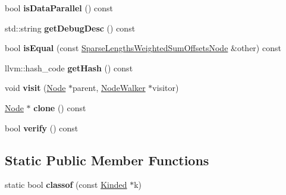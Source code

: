 \begin{DoxyCompactItemize}
\item 
\mbox{\label{classglow_1_1_sparse_lengths_weighted_sum_offsets_node_ac48c77093e3fdeac98dd497085a49a45}} 
bool {\bfseries is\+Data\+Parallel} () const
\item 
\mbox{\label{classglow_1_1_sparse_lengths_weighted_sum_offsets_node_ac361f39a370e15993a1435ebfd813213}} 
std\+::string {\bfseries get\+Debug\+Desc} () const
\item 
\mbox{\label{classglow_1_1_sparse_lengths_weighted_sum_offsets_node_afb66db9efd90742e459191e574ea4b37}} 
bool {\bfseries is\+Equal} (const \hyperlink{classglow_1_1_sparse_lengths_weighted_sum_offsets_node}{Sparse\+Lengths\+Weighted\+Sum\+Offsets\+Node} \&other) const
\item 
\mbox{\label{classglow_1_1_sparse_lengths_weighted_sum_offsets_node_accccfc5ce1c37bc92030a566503bfc4d}} 
llvm\+::hash\+\_\+code {\bfseries get\+Hash} () const
\item 
\mbox{\label{classglow_1_1_sparse_lengths_weighted_sum_offsets_node_ae7231c32c2aac37eef54eb6cc139e915}} 
void {\bfseries visit} (\hyperlink{classglow_1_1_node}{Node} $\ast$parent, \hyperlink{classglow_1_1_node_walker}{Node\+Walker} $\ast$visitor)
\item 
\mbox{\label{classglow_1_1_sparse_lengths_weighted_sum_offsets_node_aa5326a5ae70afdf02e55c235672e9d03}} 
\hyperlink{classglow_1_1_node}{Node} $\ast$ {\bfseries clone} () const
\item 
\mbox{\label{classglow_1_1_sparse_lengths_weighted_sum_offsets_node_aad9675ea9f0ed5c306d6a6c64f8b586f}} 
bool {\bfseries verify} () const
\end{DoxyCompactItemize}
\subsection*{Static Public Member Functions}
\begin{DoxyCompactItemize}
\item 
\mbox{\label{classglow_1_1_sparse_lengths_weighted_sum_offsets_node_a0daa6259e21935c62960290c16b80098}} 
static bool {\bfseries classof} (const \hyperlink{classglow_1_1_kinded}{Kinded} $\ast$k)
\end{DoxyCompactItemize}
